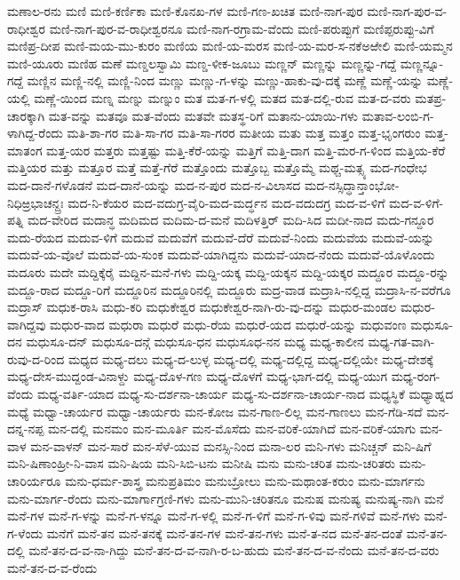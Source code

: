 ಮಣಾಲ-ರನು
ಮಣಿ
ಮಣಿ-ಕರ್ಣಿಕಾ
ಮಣಿ-ಕೊನಖ-ಗಳ
ಮಣಿ-ಗಣ-ಖಚಿತ
ಮಣಿ-ನಾಗ-ಪುರ
ಮಣಿ-ನಾಗ-ಪುರ-ವ-ರಾಧೀಶ್ವರ
ಮಣಿ-ನಾಗ-ಪುರ-ವ-ರಾಧೀಶ್ವರನೂ
ಮಣಿ-ನಾಗ-ರಗ್ರಾಮ-ವೆಂದು
ಮಣಿ-ಪರುಪ್ಪುಗೆ
ಮಣಿಪ್ಪರುಪ್ಪು-ವಿಗೆ
ಮಣಿಪ್ರ-ದೀಪ
ಮಣಿ-ಮಯ-ಮು-ಕುರಂ
ಮಣಿಯ
ಮಣಿ-ಯ-ಮರಸ
ಮಣಿ-ಯ-ಮರ-ಸ-ನಕೆಅಱೇಲಿ
ಮಣಿ-ಯಮ್ಮನ
ಮಣಿ-ಯೂರು
ಮಣಿಹ
ಮಣೆ
ಮಣ್ಡಲಸ್ವಾಮಿ
ಮಣ್ಡ-ಳೀಕ-ಜೂಬು
ಮಣ್ಣನ್
ಮಣ್ಣನ್ನು
ಮಣ್ಣನ್ನು-ಗದ್ದೆ
ಮಣ್ಣನ್ನೂ-ಗದ್ದೆ
ಮಣ್ಣಿನ
ಮಣ್ಣಿ-ನಲ್ಲಿ
ಮಣ್ಣಿ-ನಿಂದ
ಮಣ್ಣು
ಮಣ್ಣು-ಗ-ಳನ್ನು
ಮಣ್ಣು-ಹಾಕು-ವು-ದಕ್ಕೆ
ಮಣ್ಣೆ
ಮಣ್ಣೆ-ಯನ್ನು
ಮಣ್ಣೆ-ಯಲ್ಲಿ
ಮಣ್ಣೆ-ಯಿಂದ
ಮಣ್ನ
ಮಣ್ನು
ಮಣ್ನುಂ
ಮತ
ಮತ-ಗ-ಳಲ್ಲಿ
ಮತದ
ಮತ-ದಲ್ಲಿ-ರುವ
ಮತ-ದ-ವರು
ಮತಪ್ರ-ಚಾರಕ್ಕಾಗಿ
ಮತ-ವನ್ನು
ಮತವೂ
ಮತ-ವೆಂದು
ಮತವೇ
ಮತಸ್ಥ-ರಿಗೆ
ಮತಾನು-ಯಾಯಿ-ಗಳು
ಮತಾವ-ಲಂಬಿ-ಗ-ಳಾಗಿದ್ದ-ರೆಂದು
ಮತಿ-ಶಾ-ಗರ
ಮತಿ-ಸಾ-ಗರ
ಮತಿ-ಸಾ-ಗರರ
ಮತೀಯ
ಮತು
ಮತ್ತ
ಮತ್ತಂ
ಮತ್ತ-ಭೃಂಗರುಂ
ಮತ್ತ-ಮಾತಂಗ
ಮತ್ತ-ಯರ
ಮತ್ತರು
ಮತ್ತಷ್ಟು
ಮತ್ತಿ-ಕೆರೆ-ಯನ್ನು
ಮತ್ತಿಗೆ
ಮತ್ತಿ-ದಾಗ
ಮತ್ತಿ-ಮರ-ಗ-ಳಿಂದ
ಮತ್ತಿಯ-ಕೆರೆ
ಮತ್ತಿಯರ
ಮತ್ತು
ಮತ್ತೂರ
ಮತ್ತೆ
ಮತ್ತೆ-ಗೆರೆ
ಮತ್ತೊಂದು
ಮತ್ತೊಬ್ಬ
ಮತ್ತೊಮ್ಮೆ
ಮಥ್ಚ-ಮತ್ಸ್ಯ
ಮದ-ಗಂಧೇಭ
ಮದ-ದಾನೆ-ಗಳೊಡನೆ
ಮದ-ದಾನೆ-ಯನ್ನು
ಮದ-ನ-ಪುರ
ಮದ-ನ-ವಿಲಾಸದ
ಮದ-ನಸ್ಸಿದ್ಧಾನ್ತಾಂಭೋ-ನಿಧಿಱ್ರಭಾಚನ್ದ್ರಃ
ಮದ-ನಿ-ಕೆಯರ
ಮದ-ವದುಗ್ರ-ವೈರಿ-ಮದ-ಮರ್ದ್ಧನ
ಮದ-ವದುದಗ್ರ
ಮದ-ವ-ಳಿಗೆ
ಮದ-ವ-ಳಿಗೆ-ಪತ್ನಿ
ಮದ-ವೇರಿದ
ಮದಾನ್ಧ
ಮದಿಮದ
ಮದಿಮ-ದ-ಮನೆ
ಮದಿಳತ್ತಿರ್
ಮದಿ-ಸಿದ
ಮದೀ-ನಾದ
ಮದು-ಗನ್ದೂರ
ಮದು-ರೆಯದ
ಮದುವ-ಳಿಗೆ
ಮದುವೆ
ಮದುವೆಗೆ
ಮದುವೆ-ದೆರೆ
ಮದುವೆ-ನಿಂದು
ಮದುವೆಯ
ಮದುವೆ-ಯನ್ನು
ಮದುವೆ-ಯ-ವೊಲೆ
ಮದುವೆ-ಯ-ಸುಂಕ
ಮದುವೆ-ಯಾಗಿದ್ದನು
ಮದುವೆ-ಯಾದ-ನೆಂದು
ಮದುವೆ-ಯೊಳೊಂದು
ಮದೂರು
ಮದೇ
ಮದ್ದಿಕ್ಕೆರೈ
ಮದ್ದಿನ-ಮನೆ-ಗಳು
ಮದ್ದಿ-ಯಕ್ಕ
ಮದ್ದಿ-ಯಕ್ಕನ
ಮದ್ದಿ-ಯಕ್ಕರ
ಮದ್ದೂರ
ಮದ್ದೂ-ರನ್ನು
ಮದ್ದೂ-ರಾದ
ಮದ್ದೂ-ರಿಗೆ
ಮದ್ದೂರಿನ
ಮದ್ದೂರಿನಲ್ಲಿ
ಮದ್ದೂರು
ಮದ್ರ-ವಾಡ
ಮದ್ರಾಸಿ-ನಲ್ಲಿದ್ದ
ಮದ್ರಾಸಿ-ನ-ವರೆಗೂ
ಮದ್ರಾಸ್
ಮಧುಕ-ರಾಸಿ
ಮಧು-ಕರಿ
ಮಧುಕೇಶ್ವರ
ಮಧುಕೇಶ್ವರ-ನಾಗಿ-ರು-ವು-ದನ್ನು
ಮಧುರ-ಮಂಡಲ
ಮಧುರ-ವಾಗಿದ್ದವು
ಮಧುರ-ವಾದ
ಮಧುರಾ
ಮಧುರೆ
ಮಧು-ರೆಯ
ಮಧುರೆ-ಯದ
ಮಧುರೆ-ಯನ್ನು
ಮಧುವಂಣ
ಮಧುಸೂ-ದನ
ಮಧುಸೂ-ದನ್
ಮಧುಸೂ-ದನ್ಗೆ
ಮಧುಸೂ-ಧನ
ಮಧುಸೂಧ-ನನ
ಮಧ್ಯ
ಮಧ್ಯ-ಕಾಲೀನ
ಮಧ್ಯ-ಗತ-ವಾಗಿ-ರುವು-ದ-ರಿಂದ
ಮಧ್ಯದ
ಮಧ್ಯ-ದಲು
ಮಧ್ಯ-ದ-ಲುಳ್ಳ
ಮಧ್ಯ-ದಲ್ಲಿ
ಮಧ್ಯ-ದಲ್ಲಿದ್ದ
ಮಧ್ಯ-ದಲ್ಲಿಯೇ
ಮಧ್ಯ-ದೇಶಕ್ಕೆ
ಮಧ್ಯ-ದೇಸ-ಮುದ್ದಂಡ-ವಿನಾಳ್ದು
ಮಧ್ಯ-ದೊಳ-ಗಣ
ಮಧ್ಯ-ದೊಳಗೆ
ಮಧ್ಯ-ಭಾಗ-ದಲ್ಲಿ
ಮಧ್ಯ-ಯುಗ
ಮಧ್ಯ-ರಂಗ-ವೆಂದು
ಮಧ್ಯ-ವರ್ತಿ-ಯಾದ
ಮಧ್ಯ-ಸು-ದರ್ಶನಾ-ಚಾರ್ಯ
ಮಧ್ಯ-ಸು-ದರ್ಶನಾ-ಚಾರ್ಯ-ನಾದ
ಮಧ್ಯಸ್ಥಿಕೆ
ಮಧ್ಯಾಹ್ನದ
ಮಧ್ಯೆ
ಮಧ್ವಾ-ಚಾರ್ಯರ
ಮಧ್ವಾ-ಚಾರ್ಯರು
ಮನ-ಕೋಜ
ಮನ-ಗಾಣ-ಲಿಲ್ಲ
ಮನ-ಗಾಣಲು
ಮನ-ಗೆಡಿ-ಸದೆ
ಮನ-ದನ್ನ-ನಪ್ಪ
ಮನ-ದಲ್ಲಿ
ಮನಮಂ
ಮನ-ಮೂರ್ತಿ
ಮನ-ಮೊಸೆದು
ಮನ-ವರಿಕೆ-ಯಾಗಿದೆ
ಮನ-ವರಿಕೆ-ಯಾಗು
ಮನ-ವಾಳ
ಮನ-ವಾಳನ್
ಮನ-ಸಾರೆ
ಮನ-ಸೆಳೆ-ಯುವ
ಮನಸ್ಸಿ-ನಿಂದ
ಮನಾ-ಲರ
ಮನಿ-ಗಳು
ಮನಿಚ್ಚನ್
ಮನಿ-ಷಿಗೆ
ಮನಿ-ಷಿಣಾಂಹ್ರೀ-ನಿ-ವಾಸ
ಮನಿ-ಷಿಯ
ಮನಿ-ಸಿಬಿ-ಟನು
ಮನೀಷಿ
ಮನು
ಮನು-ಚರಿತ
ಮನು-ಚರಿತರು
ಮನು-ಚಾರಿರ್ಯರೂ
ಮನು-ಧರ್ಮ-ಶಾಸ್ತ್ರ
ಮನುಪ್ರತಿಮಂ
ಮನುಬ್ರೋಲು
ಮನು-ಮಥಾಂತ-ಕರುಂ
ಮನು-ಮಾರ್ಗನು
ಮನು-ಮಾರ್ಗ-ರೆಂದು
ಮನು-ಮಾರ್ಗಾಗ್ರಣಿ-ಗಳು
ಮನು-ಮುನಿ-ಚರಿತನೂ
ಮನುಷ
ಮನುಷ್ಯ
ಮನುಷ್ಯ-ನಾಗಿ
ಮನೆ
ಮನೆ-ಗಳ
ಮನೆ-ಗ-ಳನ್ನು
ಮನೆ-ಗ-ಳನ್ನೂ
ಮನೆ-ಗ-ಳಲ್ಲಿ
ಮನೆ-ಗ-ಳಿಗೆ
ಮನೆ-ಗ-ಳಿವು
ಮನೆ-ಗಳಿವೆ
ಮನೆ-ಗಳು
ಮನೆ-ಗ-ಳೆಂದು
ಮನೆಗೆ
ಮನೆ-ತನ
ಮನೆ-ತನಕ್ಕೆ
ಮನೆ-ತನ-ಗಳ
ಮನೆ-ತನ-ಗಳು
ಮನೆ-ತ-ನದ
ಮನೆ-ತನ-ದಂತೆ
ಮನೆ-ತನ-ದಲ್ಲಿ
ಮನೆ-ತನ-ದ-ವ-ನಾ-ಗಿದ್ದು
ಮನೆ-ತನ-ದ-ವ-ನಾಗಿ-ರ-ಬ-ಹುದು
ಮನೆ-ತನ-ದ-ವ-ನೆಂದು
ಮನೆ-ತನ-ದ-ವರು
ಮನೆ-ತನ-ದ-ವ-ರೆಂದು
